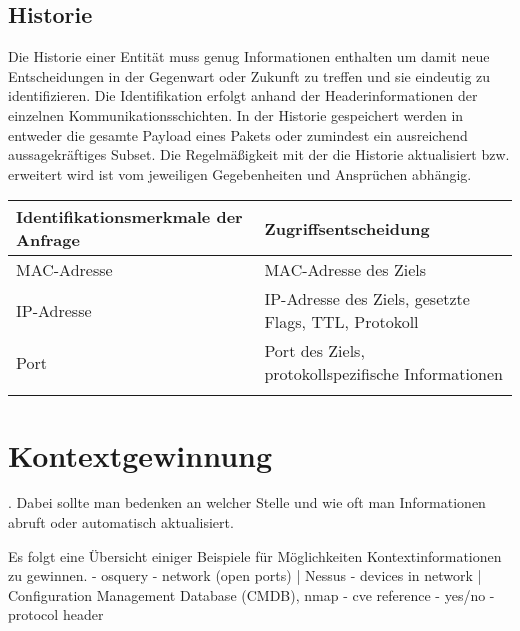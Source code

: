 \subsection{Historie}
Die Historie einer Entität muss genug Informationen enthalten um damit neue Entscheidungen in der Gegenwart oder Zukunft zu treffen und sie eindeutig zu identifizieren. Die Identifikation erfolgt anhand der Headerinformationen der einzelnen  Kommunikationsschichten. In der Historie gespeichert werden in entweder die gesamte Payload eines Pakets oder zumindest ein ausreichend aussagekräftiges Subset. Die Regelmäßigkeit mit der die Historie aktualisiert bzw. erweitert wird ist vom jeweiligen Gegebenheiten und Ansprüchen abhängig.\\
\begin{tabularx}{1\textwidth} { 
  | >{\raggedright\arraybackslash}X 
  | >{\raggedright\arraybackslash}X 
  | }
 \hline
 Identifikationsmerkmale der Anfrage & Zugriffsentscheidung \\
 \hline
 MAC-Adresse & MAC-Adresse des Ziels  \\\hline
 IP-Adresse &  IP-Adresse des Ziels, gesetzte Flags, TTL, Protokoll \\\hline
 Port & Port des Ziels, protokollspezifische Informationen\\
 		& 			\\
\hline
\end{tabularx}


\section{Kontextgewinnung}
.
Dabei sollte man bedenken an welcher Stelle und wie oft man Informationen abruft oder automatisch aktualisiert. \cite{perera_context_2014}

Es folgt eine Übersicht einiger Beispiele für Möglichkeiten Kontextinformationen zu gewinnen. 
- osquery
- network (open ports) | Nessus
- devices in network | Configuration Management Database (CMDB), nmap   
- cve reference - yes/no
- protocol header

